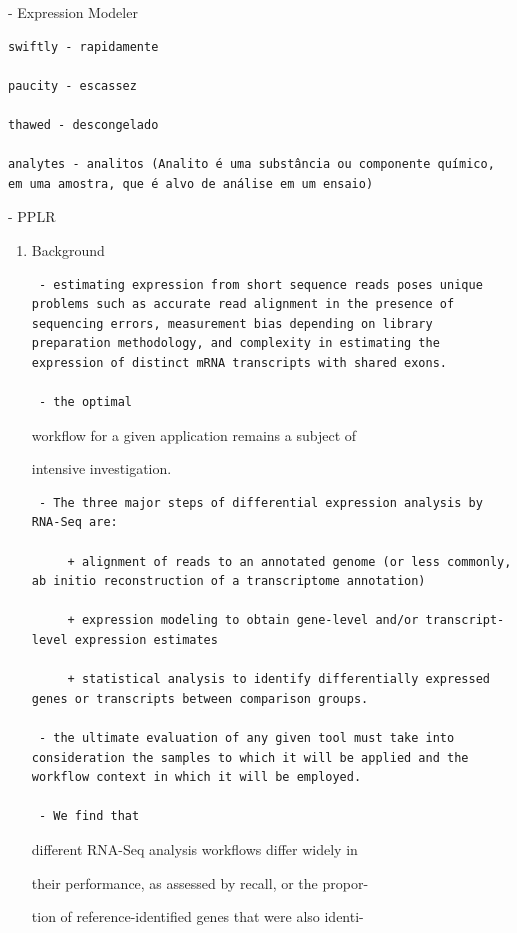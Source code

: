 \documentclass[
]{book}
\begin{document}
- Expression Modeler

\begin{verbatim}
swiftly - rapidamente

paucity - escassez

thawed - descongelado

analytes - analitos (Analito é uma substância ou componente químico, em uma amostra, que é alvo de análise em um ensaio)
\end{verbatim}

- PPLR

\begin{enumerate}
\def\labelenumi{\arabic{enumi})}
\item
  Background

\begin{verbatim}
 - estimating expression from short sequence reads poses unique problems such as accurate read alignment in the presence of sequencing errors, measurement bias depending on library preparation methodology, and complexity in estimating the expression of distinct mRNA transcripts with shared exons.

 - the optimal
\end{verbatim}

  workflow for a given application remains a subject of

  intensive investigation.

\begin{verbatim}
 - The three major steps of differential expression analysis by RNA-Seq are:

     + alignment of reads to an annotated genome (or less commonly, ab initio reconstruction of a transcriptome annotation)

     + expression modeling to obtain gene-level and/or transcript-level expression estimates

     + statistical analysis to identify differentially expressed genes or transcripts between comparison groups.

 - the ultimate evaluation of any given tool must take into consideration the samples to which it will be applied and the workflow context in which it will be employed.

 - We find that
\end{verbatim}

  different RNA-Seq analysis workflows differ widely in

  their performance, as assessed by recall, or the propor-

  tion of reference-identified genes that were also identi-


\end{enumerate}
\end{document}
